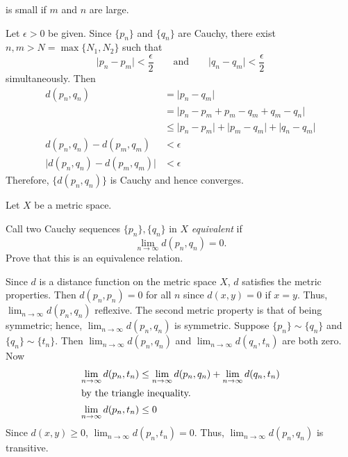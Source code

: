 \begin{exercise}
{\[    \]
    is small if \(m\) and \(n\) are large.}
  \par\smallskip
  Let \(\epsilon > 0\) be given.
  Since \(\{p_n\}\) and \(\{q_n\}\) are Cauchy, there exist
  \(n,m > N = \max\{N_1,N_2\}\) such that
  \[
  \lvert p_n - p_m\rvert < \frac{\epsilon}{2}\qquad\text{and}\qquad
  \lvert q_n - q_m\rvert < \frac{\epsilon}{2}
  \]
  simultaneously.
  Then
  \begin{align*}
    d(p_n, q_n) & = \lvert p_n - q_m\rvert\\
                & = \lvert p_n - p_m + p_m - q_m + q_m - q_n\rvert\\
                & \leq \lvert p_n - p_m\rvert + \lvert p_m - q_m\rvert +
                  \lvert q_n - q_m\rvert\\
    d(p_n, q_n) - d(p_m, q_m) & < \epsilon\\
    \lvert d(p_n, q_n) - d(p_m, q_m)\rvert & < \epsilon
  \end{align*}
  Therefore, \(\{d(p_n,q_n)\}\) is Cauchy and hence converges.
\item
  Let \(X\) be a metric space.
  \begin{exercise}[label = (\alph*), ref = \arabic{exercisei} (\alph*)]
  \item
    Call two Cauchy sequences \(\{p_n\},\{q_n\}\) in \(X\) \textit{equivalent}
    if
    \[
    \lim_{n\to\infty} d(p_n,q_n) = 0.
    \]
    Prove that this is an equivalence relation.
    \par\smallskip
    Since \(d\) is a distance function on the metric space \(X\), \(d\)
    satisfies the metric properties.
    Then \(d(p_n,p_n) = 0\) for all \(n\) since \(d(x,y) = 0\) if \(x = y\).
    Thus, \(\lim_{n\to\infty}d(p_n,q_n)\) reflexive.
    The second metric property is that of being symmetric; hence,
    \(\lim_{n\to\infty}d(p_n,q_n)\) is symmetric.
    Suppose \(\{p_n\}\sim\{q_n\}\) and \(\{q_n\}\sim\{t_n\}\).
    Then \(\lim_{n\to\infty}d(p_n,q_n)\) and \(\lim_{n\to\infty}d(q_n,t_n)\)
    are both zero.
    Now
    \begin{align*}
      \lim_{n\to\infty}d(p_n, t_n) & \leq \lim_{n\to\infty}d(p_n, q_n) +
                                     \lim_{n\to\infty}d(q_n, t_n)\\
      \intertext{by the triangle inequality.}
      \lim_{n\to\infty}d(p_n, t_n) & \leq 0
    \end{align*}
    Since \(d(x,y)\geq 0\), \(\lim_{n\to\infty}d(p_n, t_n) = 0\).
    Thus, \(\lim_{n\to\infty}d(p_n,q_n)\) is transitive.
  \item

\end{exercise}
\end{exercise}
